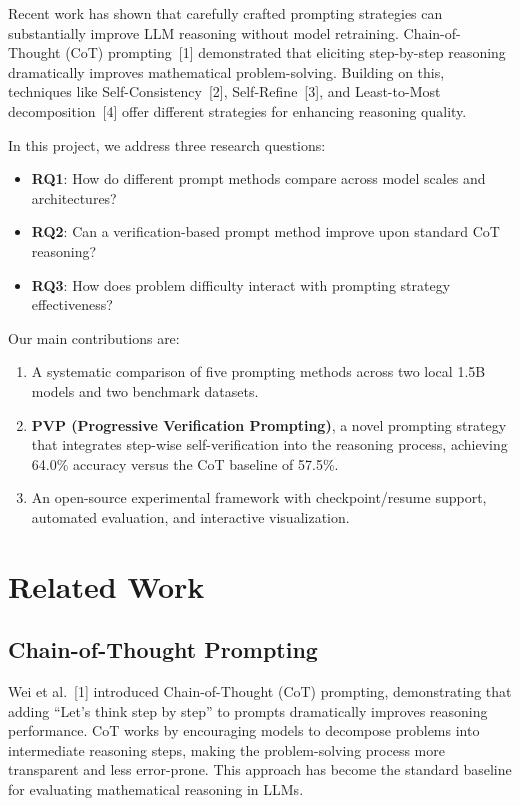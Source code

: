 \documentclass[conference]{IEEEtran}
\begin{document}
Recent work has shown that carefully crafted prompting strategies can substantially improve LLM reasoning without model retraining. Chain-of-Thought (CoT) prompting~[1] demonstrated that eliciting step-by-step reasoning dramatically improves mathematical problem-solving. Building on this, techniques like Self-Consistency~[2], Self-Refine~[3], and Least-to-Most decomposition~[4] offer different strategies for enhancing reasoning quality.

In this project, we address three research questions:
\begin{itemize}
    \item \textbf{RQ1}: How do different prompt methods compare across model scales and architectures?
    \item \textbf{RQ2}: Can a verification-based prompt method improve upon standard CoT reasoning?
    \item \textbf{RQ3}: How does problem difficulty interact with prompting strategy effectiveness?
\end{itemize}

Our main contributions are:
\begin{enumerate}
    \item A systematic comparison of five prompting methods across two local 1.5B models and two benchmark datasets.
    \item \textbf{PVP (Progressive Verification Prompting)}, a novel prompting strategy that integrates step-wise self-verification into the reasoning process, achieving 64.0\% accuracy versus the CoT baseline of 57.5\%.
    \item An open-source experimental framework with checkpoint/resume support, automated evaluation, and interactive visualization.
\end{enumerate}

\section{Related Work}

\subsection{Chain-of-Thought Prompting}
Wei et al.~[1] introduced Chain-of-Thought (CoT) prompting, demonstrating that adding ``Let's think step by step'' to prompts dramatically improves reasoning performance. CoT works by encouraging models to decompose problems into intermediate reasoning steps, making the problem-solving process more transparent and less error-prone. This approach has become the standard baseline for evaluating mathematical reasoning in LLMs.
\end{document}
